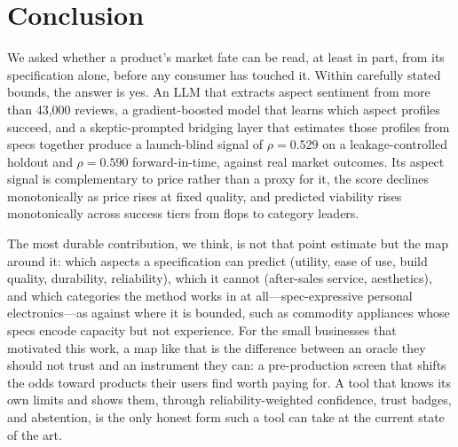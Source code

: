 \documentclass[journal]{IEEEtran}
\begin{document}
\section{Conclusion}
We asked whether a product's market fate can be read, at least in part, from its specification alone, before any consumer has touched it. Within carefully stated bounds, the answer is yes. An LLM that extracts aspect sentiment from more than 43{,}000 reviews, a gradient-boosted model that learns which aspect profiles succeed, and a skeptic-prompted bridging layer that estimates those profiles from specs together produce a launch-blind signal of $\rho = 0.529$ on a leakage-controlled holdout and $\rho = 0.590$ forward-in-time, against real market outcomes. Its aspect signal is complementary to price rather than a proxy for it, the score declines monotonically as price rises at fixed quality, and predicted viability rises monotonically across success tiers from flops to category leaders.

The most durable contribution, we think, is not that point estimate but the map around it: which aspects a specification can predict (utility, ease of use, build quality, durability, reliability), which it cannot (after-sales service, aesthetics), and which categories the method works in at all---spec-expressive personal electronics---as against where it is bounded, such as commodity appliances whose specs encode capacity but not experience. For the small businesses that motivated this work, a map like that is the difference between an oracle they should not trust and an instrument they can: a pre-production screen that shifts the odds toward products their users find worth paying for. A tool that knows its own limits and shows them, through reliability-weighted confidence, trust badges, and abstention, is the only honest form such a tool can take at the current state of the art.



\end{document}
